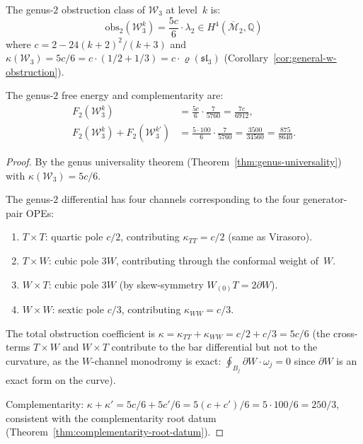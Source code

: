 \begin{proposition}\label{prop:w3-genus2-curvature}
The genus-$2$ obstruction class of $\mathcal{W}_3$ at level~$k$ is:
\begin{equation}\label{eq:w3-obs2}
\mathrm{obs}_2(\mathcal{W}_3^k) = \frac{5c}{6} \cdot \lambda_2
\in H^4(\overline{\mathcal{M}}_2, \mathbb{Q})
\end{equation}
where $c = 2 - 24(k+2)^2/(k+3)$ and
$\kappa(\mathcal{W}_3) = 5c/6 = c \cdot (1/2 + 1/3)
= c \cdot \varrho(\mathfrak{sl}_3)$
\textup{(}Corollary~\textup{\ref{cor:general-w-obstruction})}.

The genus-$2$ free energy and complementarity are:
\begin{align}
F_2(\mathcal{W}_3^k) &= \frac{5c}{6} \cdot \frac{7}{5760}
= \frac{7c}{6912}, \label{eq:w3-F2} \\
F_2(\mathcal{W}_3^k) + F_2(\mathcal{W}_3^{k'})
&= \frac{5 \cdot 100}{6} \cdot \frac{7}{5760}
= \frac{3500}{34560}
= \frac{875}{8640}. \label{eq:w3-F2-complementarity}
\end{align}
\end{proposition}

\begin{proof}
By the genus universality theorem
(Theorem~\ref{thm:genus-universality}) with
$\kappa(\mathcal{W}_3) = 5c/6$.

The genus-$2$ differential has four channels corresponding to
the four generator-pair OPEs:
\begin{enumerate}[label=\textup{(\roman*)}]
\item $T \times T$: quartic pole $c/2$, contributing
  $\kappa_{TT} = c/2$ (same as Virasoro).
\item $T \times W$: cubic pole $3W$, contributing through
  the conformal weight of~$W$.
\item $W \times T$: cubic pole $3W$ (by skew-symmetry
  $W_{(0)}T = 2\partial W$).
\item $W \times W$: sextic pole $c/3$, contributing
  $\kappa_{WW} = c/3$.
\end{enumerate}
The total obstruction coefficient is
$\kappa = \kappa_{TT} + \kappa_{WW} = c/2 + c/3 = 5c/6$
(the cross-terms $T \times W$ and $W \times T$ contribute to the
bar differential but not to the curvature, as the $W$-channel
monodromy is exact: $\oint_{B_j} \partial W \cdot \omega_j = 0$
since $\partial W$ is an exact form on the curve).

Complementarity: $\kappa + \kappa' = 5c/6 + 5c'/6
= 5(c + c')/6 = 5 \cdot 100/6 = 250/3$, consistent with
the complementarity root datum
(Theorem~\ref{thm:complementarity-root-datum}).
\end{proof}

